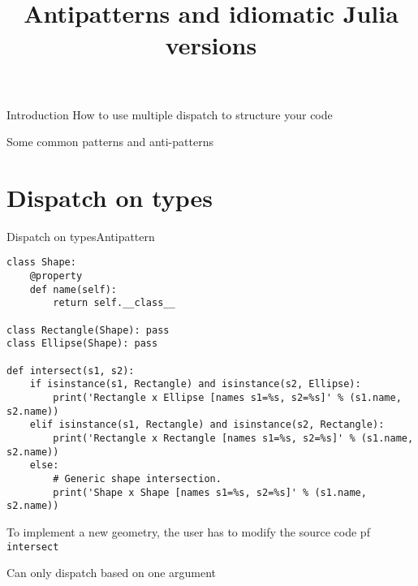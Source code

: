 
\title{Antipatterns and idiomatic Julia versions}

\maketitle

\begin{frame}{Introduction}{}
    How to use multiple dispatch to structure your code

    Some common patterns and anti-patterns
\end{frame}



\section{Dispatch on types}

\begin{frame}[fragile]{Dispatch on types}{Antipattern}

    \begin{verbatim}
class Shape:
    @property
    def name(self):
        return self.__class__

class Rectangle(Shape): pass
class Ellipse(Shape): pass

def intersect(s1, s2):
    if isinstance(s1, Rectangle) and isinstance(s2, Ellipse):
        print('Rectangle x Ellipse [names s1=%s, s2=%s]' % (s1.name, s2.name))
    elif isinstance(s1, Rectangle) and isinstance(s2, Rectangle):
        print('Rectangle x Rectangle [names s1=%s, s2=%s]' % (s1.name, s2.name))
    else:
        # Generic shape intersection.
        print('Shape x Shape [names s1=%s, s2=%s]' % (s1.name, s2.name))
    \end{verbatim}
     To implement a new geometry, the user has to
modify the source code pf \texttt{intersect}

\vspace{3mm}
Can only dispatch based on one argument
\end{frame}


